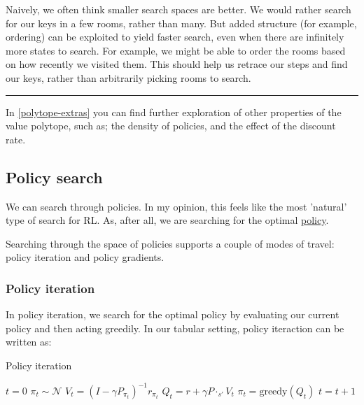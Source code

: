 Naively, we often think smaller search spaces are better. We would rather
search for our keys in a few rooms, rather than many. But added
structure (for example, ordering) can be exploited to yield faster
search, even when there are infinitely more states to search. For example,
we might be able to order the rooms based on how recently we visited them.
This should help us retrace our steps and find our keys, rather than arbitrarily
picking rooms to search.

\begin{center}\rule{0.5\linewidth}{\linethickness}\end{center}

In \ref{polytope-extras} you can find further exploration of other properties of
the value polytope, such as; the density of policies, and the effect of the discount
rate.

\subsection{Policy search}

We can search through policies. In my opinion, this feels like the most 'natural' type of search for RL.
As, after all, we are searching for the optimal \underline{policy}.

Searching through the space of policies supports a couple of modes of travel:
policy iteration and policy gradients.

\subsubsection{Policy iteration}

In policy iteration, we search for the optimal policy by evaluating our current
policy and then acting greedily. In our tabular setting, policy iteraction can be written as:

\begin{algorithm}
\caption{Policy iteration}
\begin{algorithmic}[1]

    \State $t=0$
    \State $\pi_t \sim \mathcal N$  
      \State $V_t = (I-\gamma P_{\pi_t})^{-1} r_{\pi_t}$ 
      \State $Q_t =  r + \gamma P\cdot_{s'} V_t$ 
      \State $\pi_t = \text{greedy}(Q_t) $ 
      \State $t = t + 1$
    \EndWhile
    \State {}
\EndProcedure

\end{algorithmic}
\end{algorithm}

